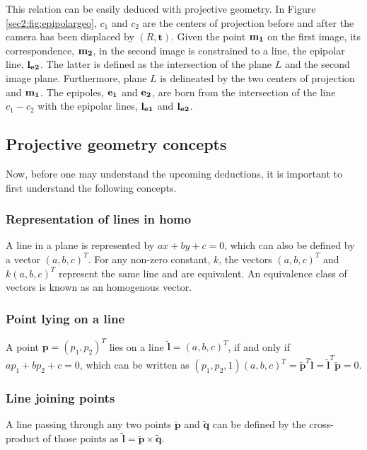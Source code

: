 This relation can be easily deduced with projective geometry. In Figure \ref{sec2:fig:epipolargeo}, $c_1$ and $c_2$ are the centers of projection before and after the camera has been displaced by $(R, \mathbf{t})$. Given the point $\bf m_1$ on the first image, its correspondence, $\bf m_2$, in the second image is constrained to a line, the epipolar line, $\bf l_{e2}$. The latter is defined as the intersection of the plane $L$ and the second image plane. Furthermore, plane $L$ is delineated by the two centers of projection and $\bf m_1$. The epipoles, $\bf e_1$ and $\bf e_2$, are born from the intersection of the line $c_1 - c_2$ with the epipolar lines, $\bf l_{e1}$ and $\bf l_{e2}$. 

\subsection{Projective geometry concepts}

Now, before one may understand the upcoming deductions, it is important to first understand the following concepts.
\subsubsection{Representation of lines in \gls{homo}}
A line in a plane is represented by $a x + b y + c = 0$, which can also be defined by a vector $( a , b , c ) ^T$. For any non-zero constant, $k$, the vectors  $( a , b , c ) ^T$ and $k(a , b , c ) ^T$ represent the same line and are equivalent. An equivalence class of vectors is known as an homogenous vector. 
\subsubsection{Point lying on a line}
A point $\mathbf { p } = ( p_1 , p_2 ) ^ T$ lies on a line $\mathbf {\tilde{l}} = ( a , b , c ) ^ { T }$, if and only if $a p_1 + b p_2 + c = 0$, which can be written as $( p_1 , p_2 , 1 ) ( a , b , c ) ^T = \mathbf { \tilde{p} } ^T \mathbf {\tilde{l}} = \mathbf {\tilde{l}} ^T \mathbf { \tilde{p} } = 0$.
\subsubsection{Line joining points}
A line passing through any two points $\mathbf{\tilde{p}}$ and $\mathbf{\tilde{q}}$ can be defined by the cross-product of those points as $\mathbf{\tilde{l}} = \mathbf{\tilde{p}} \times \mathbf{\tilde{q}}$.

